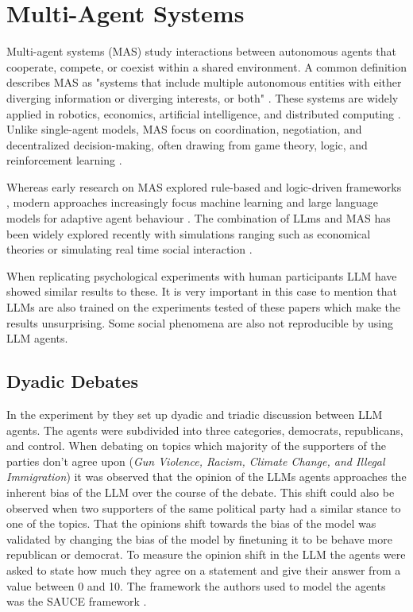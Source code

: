 \section{Multi-Agent Systems} 

Multi-agent systems (MAS) study interactions between autonomous agents that cooperate, compete, or coexist within a shared environment. A common definition describes MAS as "systems that include multiple autonomous entities with either diverging information or diverging interests, or both" \cite[p.xiii]{shoham2008multiagent}. These systems are widely applied in robotics, economics, artificial intelligence, and distributed computing \cite{wooldridge2009introduction}. Unlike single-agent models, MAS focus on coordination, negotiation, and decentralized decision-making, often drawing from game theory, logic, and reinforcement learning \cite{stone2010ad}.

Whereas early research on MAS explored rule-based and logic-driven frameworks \cite{shoham2008multiagent}, modern approaches increasingly focus machine learning and large language models for adaptive agent behaviour \cite{baker2019emergent}. The combination of LLms and MAS has been widely explored recently with simulations ranging such as economical theories \cite{zhao2023competeai} or simulating real time social interaction \cite{kaiya2023lyfe}. 

When replicating psychological experiments with human participants LLM  have showed similar results \cite{cui2024can, aher2023using} to these. It is very important in this case to mention that LLMs are also trained on the experiments tested of these papers which make the results unsurprising. Some social phenomena are also not reproducible by using LLM agents. 

\subsection{Dyadic Debates}

In the experiment by \citet{taubenfeld_systematic_2024} they set up dyadic and triadic discussion between LLM agents. The agents were subdivided into three categories, democrats, republicans, and control. When debating on topics which majority of the supporters of the parties don't agree upon (\textit{Gun Violence, Racism, Climate Change, and Illegal Immigration}) it was observed that the opinion of the LLMs agents approaches the inherent bias of the LLM over the course of the debate. This shift could also be observed when two supporters of the same political party had a similar stance to one of the topics. That the opinions shift towards the bias of the model was validated by changing the bias of the model by finetuning it to be behave more republican or democrat. To measure the opinion shift in the LLM the agents were asked to state how much they agree on a statement and give their answer from a value between 0 and 10. The framework the authors used to model the agents was the SAUCE framework \cite{neuberger2024sauce}.


